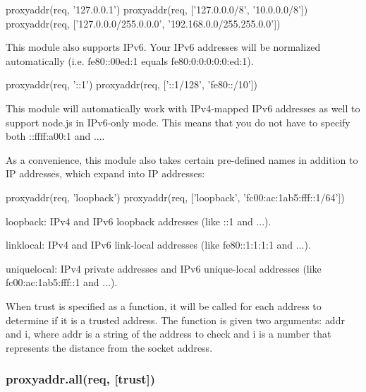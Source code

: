 \begin{DoxyCode}
proxyaddr(req, '127.0.0.1')
proxyaddr(req, ['127.0.0.0/8', '10.0.0.0/8'])
proxyaddr(req, ['127.0.0.0/255.0.0.0', '192.168.0.0/255.255.0.0'])
\end{DoxyCode}


This module also supports I\+Pv6. Your I\+Pv6 addresses will be normalized automatically (i.\+e. {\ttfamily fe80\+:\+:00ed\+:1} equals {\ttfamily fe80\+:0\+:0\+:0\+:0\+:0\+:ed\+:1}).


\begin{DoxyCode}
proxyaddr(req, '::1')
proxyaddr(req, ['::1/128', 'fe80::/10'])
\end{DoxyCode}


This module will automatically work with I\+Pv4-\/mapped I\+Pv6 addresses as well to support node.\+js in I\+Pv6-\/only mode. This means that you do not have to specify both {\ttfamily \+::ffff\+:a00\+:1} and {...}.

As a convenience, this module also takes certain pre-\/defined names in addition to IP addresses, which expand into IP addresses\+:


\begin{DoxyCode}
proxyaddr(req, 'loopback')
proxyaddr(req, ['loopback', 'fc00:ac:1ab5:fff::1/64'])
\end{DoxyCode}



\begin{DoxyItemize}
\item {\ttfamily loopback}\+: I\+Pv4 and I\+Pv6 loopback addresses (like {\ttfamily \+:\+:1} and {...}).
\item {\ttfamily linklocal}\+: I\+Pv4 and I\+Pv6 link-\/local addresses (like {\ttfamily fe80\+:\+:1\+:1\+:1\+:1} and {...}).
\item {\ttfamily uniquelocal}\+: I\+Pv4 private addresses and I\+Pv6 unique-\/local addresses (like {\ttfamily fc00\+:ac\+:1ab5\+:fff\+:\+:1} and {...}).
\end{DoxyItemize}

When {\ttfamily trust} is specified as a function, it will be called for each address to determine if it is a trusted address. The function is given two arguments\+: {\ttfamily addr} and {\ttfamily i}, where {\ttfamily addr} is a string of the address to check and {\ttfamily i} is a number that represents the distance from the socket address.

\subsubsection*{proxyaddr.\+all(req, \mbox{[}trust\mbox{]})}

